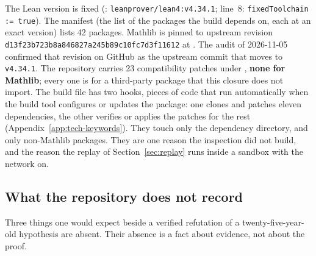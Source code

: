 The Lean version is fixed (:
\texttt{leanprover/lean4:v4.34.1}; 
line~8: \texttt{fixedToolchain := true}). The manifest (the list of the packages the build depends on, each at an exact version) lists 42 packages. Mathlib is pinned to upstream revision
\texttt{d13f23b723b8a846827a245b89c10fc7d3f11612} at
. The audit of 2026-11-05
confirmed that revision on GitHub as the upstream commit that moves to
\texttt{v4.34.1}. The repository carries 23 compatibility patches under
, \textbf{none for Mathlib}; every one is for a
third-party package that this closure does not import. The build file has two hooks, pieces of code that run automatically when the build tool configures or updates the package: one clones and patches eleven dependencies, the
other verifies or applies the patches for the rest
(Appendix~\ref{app:tech-keywords}). They touch only the dependency
directory, and only non-Mathlib packages. They are one reason the
inspection did not build, and the reason the replay of
Section~\ref{sec:replay} runs inside a sandbox with the network on.

\subsection{What the repository does not record}
\label{sec:proof-missing}

Three things one would expect beside a verified refutation of a
twenty-five-year-old hypothesis are absent. Their absence is a fact about
evidence, not about the proof.

